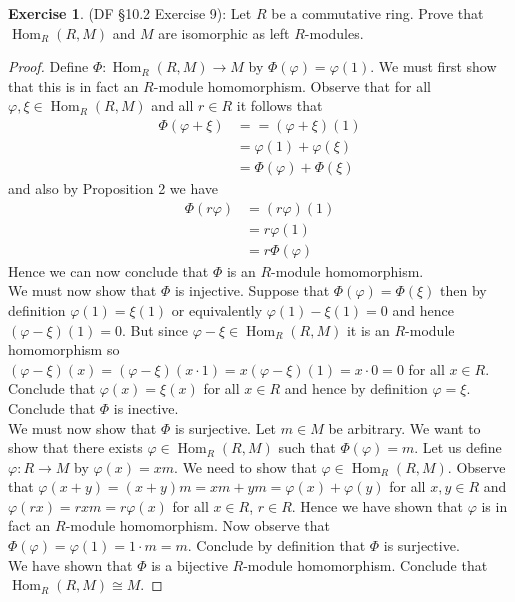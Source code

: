 \documentclass[8pt]{amsart}
\theoremstyle{plain}%
\theoremstyle{definition}
\newtheorem{exercise}{Exercise}[section]
\theoremstyle{remark}
\numberwithin{equation}{section}
\begin{document}
\begin{exercise}
(DF \S 10.2 Exercise 9): Let $R$ be a commutative ring. Prove that $\operatorname{Hom}_R(R, M)$ and $M$ are isomorphic as left $R$-modules.
	\begin{proof}
		Define $\Phi : \operatorname{Hom}_R(R, M) \to M$ by $\Phi(\varphi) = \varphi(1)$. We must first show that this is in fact an $R$-module homomorphism. Observe that for all $\varphi, \xi \in \operatorname{Hom}_R(R, M)$ and all $r \in R$ it follows that
		\begin{align*}
			\Phi(\varphi + \xi) &= = (\varphi + \xi)(1)\\
			&= \varphi(1) + \varphi(\xi)\\
			&= \Phi(\varphi) + \Phi(\xi) 
		\end{align*}
		and also by Proposition 2 we have
		\begin{align*}
			\Phi(r\varphi) &= (r\varphi)(1)\\
			&= r \varphi(1)\\
			&= r \Phi(\varphi)
		\end{align*}
		Hence we can now conclude that $\Phi$ is an $R$-module homomorphism.\\

		We must now show that $\Phi$ is injective. Suppose that $\Phi(\varphi) = \Phi(\xi)$ then by definition $\varphi(1) = \xi(1)$ or equivalently $\varphi(1) - \xi(1) = 0$ and hence $(\varphi - \xi)(1) = 0$. But since $\varphi - \xi \in \operatorname{Hom}_R(R, M)$ it is an $R$-module homomorphism so $(\varphi - \xi)(x) = (\varphi - \xi)(x \cdot 1) = x(\varphi - \xi)(1) = x \cdot 0 = 0$ for all $x \in R$. Conclude that $\varphi(x) = \xi(x)$ for all $x \in R$ and hence by definition $\varphi = \xi$. Conclude that $\Phi$ is inective.\\

		We must now show that $\Phi$ is surjective. Let $m \in M$ be arbitrary. We want to show that there exists $\varphi \in \operatorname{Hom}_R(R, M)$ such that $\Phi(\varphi) = m$. Let us define $\varphi : R \to M$ by $\varphi(x) = xm$. We need to show that $\varphi \in \operatorname{Hom}_R(R, M)$. Observe that $\varphi(x + y) = (x + y)m = xm + ym = \varphi(x) + \varphi(y)$ for all $x, y \in R$ and $\varphi(rx) = rxm = r \varphi(x)$ for all $x \in R$, $r \in R$. Hence we have shown that $\varphi$ is in fact an $R$-module homomorphism. Now observe that $\Phi(\varphi) = \varphi(1) = 1 \cdot m = m$. Conclude by definition that $\Phi$ is surjective.\\

	We have shown that $\Phi$ is a bijective $R$-module homomorphism. Conclude that $\operatorname{Hom}_R(R, M) \cong M$.	
	\end{proof}
\end{exercise}
\end{document}
